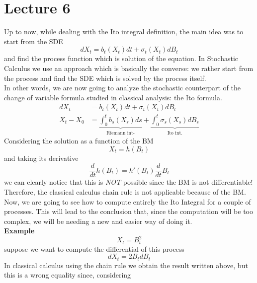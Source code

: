 \section{Lecture 6}
Up to now, while dealing with the Ito integral definition, the main idea was to start from the SDE 
\begin{equation*}
    dX_t = b_t(X_t) dt + \sigma_t(X_t) dB_t 
\end{equation*}
and find the process function which is solution of the equation. In Stochastic Calculus we use an approach which is basically the converse: we rather start from the process and find the SDE which is solved by the process itself. \\
In other words, we are now going to analyze the stochastic counterpart of the change of variable formula studied in classical analysis: the Ito formula. 
\begin{equation*}
\begin{split}
    dX_t&= b_t(X_t) dt + \sigma_t (X_t) dB_t\\
    X_t -X_0 &= \underbrace{\int_0^t b_s(X_s) ds}_{\text{Riemann int-}} + \underbrace{ \int_0^t \sigma_s (X_s) dB_s}_{\text{Ito int.}}
\end{split}
\end{equation*}
Considering the solution as a function of the BM
\begin{equation*}
    X_t = h(B_t)
\end{equation*}
and taking its derivative
\begin{equation*}
    \frac{d}{dt}h(B_t) = h'(B_t) \frac{d}{dt}B_t
\end{equation*}
we can clearly notice that this is \emph{NOT} possible since the BM is not differentiable! Therefore, the classical calculus chain rule is not applicable because of the BM. \\
Now, we are going to see how to compute entirely the Ito Integral for a couple of processes. This will lead to the conclusion that, since the computation will be too complex, we will be needing a new and easier way of doing it. \\
\textbf{Example}
\begin{equation*}
    X_t= B_t^2 
\end{equation*}
suppose we want to compute the differential of this process 
\begin{equation*}
    dX_t = 2B_t dB_t 
\end{equation*}
In classical calculus using the chain rule we obtain the result written above, but this is a wrong equality since, considering
